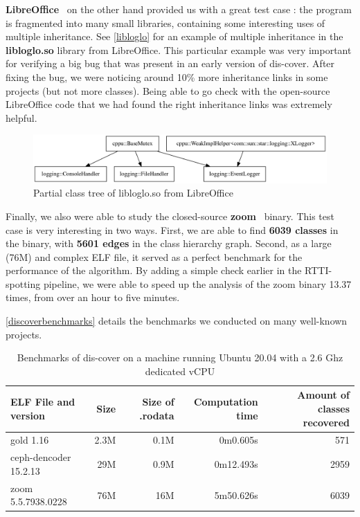 \documentclass[a4paper,11pt,oneside]{report}
\begin{document}
\textbf{LibreOffice}~\cite{libreoffice} on the other hand provided us with a great test case :
the program is fragmented into many small libraries, containing some interesting uses of multiple inheritance.
See \autoref{libloglo} for an example of multiple inheritance in the \textbf{libloglo.so} library from LibreOffice.
This particular example was very important for verifying a big bug that was present in an early version of dis-cover.
After fixing the bug, we were noticing around 10\% more inheritance links in some projects (but not more classes).
Being able to go check with the open-source LibreOffice code that we had found the right inheritance links was extremely helpful.

\begin{figure}[h]

\includegraphics[width=16cm]{libloglo_partial.png}
\caption{Partial class tree of libloglo.so from LibreOffice}
\label{libloglo}

\end{figure}

Finally, we also were able to study the closed-source \textbf{zoom}~\cite{zoom} binary.
This test case is very interesting in two ways.
First, we are able to find \textbf{6039 classes} in the binary, with \textbf{5601 edges} in the class hierarchy graph.
Second, as a large (76M) and complex ELF file, it served as a perfect benchmark for the performance of the algorithm.
By adding a simple check earlier in the RTTI-spotting pipeline, we were able to speed up the analysis of the zoom binary 13.37 times, from over an hour to five minutes.

\autoref{discoverbenchmarks} details the benchmarks we conducted on many well-known projects.

\begin{table}[h]
  \centering
  {\small
  \begin{tabular}{l | r | r | r | r }
    ELF File and version & Size & Size of .rodata & Computation time & Amount of classes recovered  \\
    \hline
    gold 1.16 & 2.3M & 0.1M & 0m0.605s & 571 \\
    ceph-dencoder 15.2.13 & 29M & 0.9M & 0m12.493s & 2959 \\
    zoom 5.5.7938.0228 & 76M & 16M & 5m50.626s & 6039 
  \end{tabular}
  }

\caption{Benchmarks of dis-cover on a machine running Ubuntu 20.04 with a 2.6 Ghz dedicated vCPU}
\label{discoverbenchmarks}

\end{table}
\end{document}
